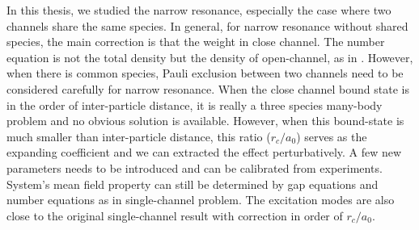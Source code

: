 In this thesis, we studied the narrow resonance, especially the case where two channels share the same species.  In general, for narrow resonance without shared species, the main correction is that the weight in close channel.  The number equation is not the total density but the density of open-channel, as in  \cite{GurarieNarrow}.  However, when there is common species,  Pauli exclusion between two channels need to be considered carefully for narrow resonance.  When the close channel bound state is in the order of   inter-particle distance, it is really a three species many-body problem and no obvious solution is available.  However, when this bound-state is much smaller than inter-particle distance, this ratio ($r_{c}/a_{0}$) serves as the expanding coefficient and we can extracted the effect perturbatively.  A few new parameters needs to be introduced and can be calibrated from experiments.  System's mean field property can still be determined by gap equations and number equations as in single-channel problem.  The excitation modes are also close to the original single-channel result with correction in order of $r_{c}/a_{0}$.
